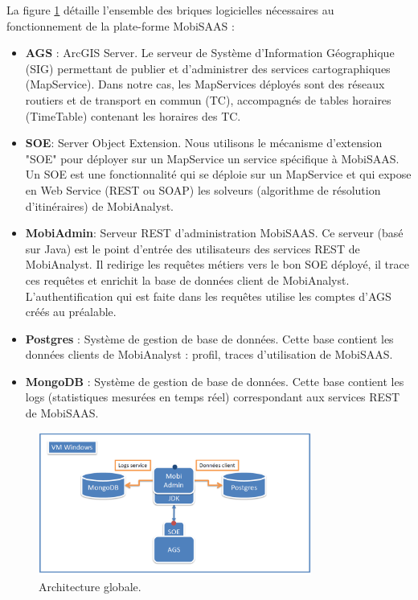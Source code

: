 La figure \ref{fig:architecture} détaille l'ensemble des briques logicielles nécessaires au fonctionnement de la plate-forme MobiSAAS :
\begin{itemize}
\item \textbf{AGS} : ArcGIS Server. Le serveur de Système d'Information Géographique (SIG) permettant de publier et d'administrer des services cartographiques (MapService).
Dans notre cas, les MapServices déployés sont des réseaux routiers et de transport en commun (TC), accompagnés de tables horaires (TimeTable) contenant les horaires des TC.
\item \textbf{SOE}: Server Object Extension. Nous utilisons le mécanisme d'extension "SOE" pour déployer sur un MapService un service spécifique à MobiSAAS. Un SOE est une fonctionnalité qui se déploie sur un MapService et qui expose en Web Service (REST ou SOAP) les solveurs (algorithme de résolution d'itinéraires) de MobiAnalyst.
\item \textbf{MobiAdmin}: Serveur REST d'administration MobiSAAS. Ce serveur (basé sur Java) est le point d'entrée des utilisateurs des services REST de MobiAnalyst.
Il redirige les requêtes métiers vers le bon SOE déployé, il trace ces requêtes et enrichit la base de données client de MobiAnalyst.
L'authentification qui est faite dans les requêtes utilise les comptes d'AGS créés au préalable.
\item \textbf{Postgres} : Système de gestion de base de données. Cette base contient les données clients de MobiAnalyst : profil, traces d'utilisation de MobiSAAS.
\item \textbf{MongoDB} : Système de gestion de base de données. Cette base contient les logs (statistiques mesurées en temps réel) correspondant aux services REST de MobiSAAS.
\end{itemize}

\begin{figure}[h]
	\centering
		\includegraphics[width=0.8\textwidth]{images/architecture.png}
	\caption{Architecture globale.}
	\label{fig:architecture}
\end{figure}\\

